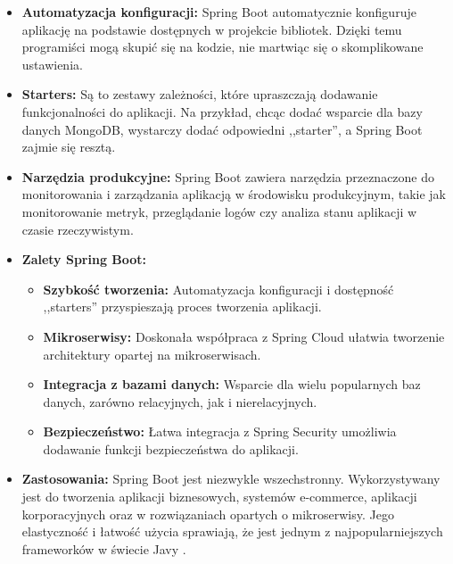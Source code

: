 \begin{itemize}
\item \textbf{Automatyzacja konfiguracji:} Spring Boot automatycznie konfiguruje aplikację na podstawie dostępnych w projekcie bibliotek. Dzięki temu programiści mogą skupić się na kodzie, nie martwiąc się o skomplikowane ustawienia.
\item \textbf{Starters:} Są to zestawy zależności, które upraszczają dodawanie funkcjonalności do aplikacji. Na przykład, chcąc dodać wsparcie dla bazy danych MongoDB, wystarczy dodać odpowiedni ,,starter'', a Spring Boot zajmie się resztą.

\item \textbf{Narzędzia produkcyjne:} Spring Boot zawiera narzędzia przeznaczone do monitorowania i zarządzania aplikacją w środowisku produkcyjnym, takie jak monitorowanie metryk, przeglądanie logów czy analiza stanu aplikacji w czasie rzeczywistym.

\item \textbf{Zalety Spring Boot:}
\begin{itemize}
    \item \textbf{Szybkość tworzenia:} Automatyzacja konfiguracji i dostępność
    ,,starters'' przyspieszają proces tworzenia aplikacji.
    \item \textbf{Mikroserwisy:} Doskonała współpraca z Spring Cloud ułatwia tworzenie architektury opartej na mikroserwisach.
    \item \textbf{Integracja z bazami danych:} Wsparcie dla wielu popularnych baz danych, zarówno relacyjnych, jak i nierelacyjnych.
    \item \textbf{Bezpieczeństwo:} Łatwa integracja z Spring Security umożliwia dodawanie funkcji bezpieczeństwa do aplikacji.
\end{itemize}

\item \textbf{Zastosowania:} Spring Boot jest niezwykle wszechstronny. Wykorzystywany jest do tworzenia aplikacji biznesowych, systemów e-commerce, aplikacji korporacyjnych oraz w rozwiązaniach opartych o mikroserwisy. Jego elastyczność i łatwość użycia sprawiają, że jest jednym z najpopularniejszych frameworków w świecie Javy \cite{springbootSpecs}.
\end{itemize}

